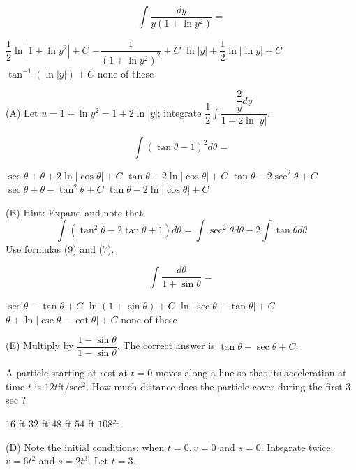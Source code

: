 \newpage




\question
\[
\displaystyle\int \dfrac{d y}{y\left(1+\ln y^{2}\right)}=
\]
\begin{choices}
  \CorrectChoice $\dfrac{1}{2} \ln \left|1+\ln y^{2}\right|+C$
  \choice $-\dfrac{1}{\left(1+\ln y^{2}\right)^{2}}+C$
  \choice $\ln |y|+\dfrac{1}{2} \ln |\ln y|+C$
  \choice $\tan ^{-1}(\ln |y|)+C$
  \choice none of these
\end{choices}
\begin{solution}
(A) Let $u=1+\ln y^{2}=1+2 \ln |y|$; integrate $\dfrac{1}{2} \displaystyle\int \dfrac{\dfrac{2}{y} d y}{1+2 \ln |y|}$.
\end{solution}

\question
\[
\displaystyle\int(\tan \theta-1)^{2} d \theta=
\]
\begin{choices}
  \choice $\sec \theta+\theta+2 \ln |\cos \theta|+C$
  \CorrectChoice $\tan \theta+2 \ln |\cos \theta|+C$
  \choice $\tan \theta-2 \sec ^{2} \theta+C$
  \choice $\sec \theta+\theta-\tan ^{2} \theta+C$
  \choice $\tan \theta-2 \ln |\cos \theta|+C$
\end{choices}
\begin{solution}
(B) Hint: Expand and note that
\[
\displaystyle\int\left(\tan ^{2} \theta-2 \tan \theta+1\right) d \theta=\displaystyle\int \sec ^{2} \theta d \theta-2 \displaystyle\int \tan \theta d \theta
\]
Use formulas (9) and (7).
\end{solution}


\newpage




\question
\[
\displaystyle\int \dfrac{d \theta}{1+\sin \theta}=
\]
\begin{choices}
  \choice $\sec \theta-\tan \theta+C$
  \choice $\ln (1+\sin \theta)+C$
  \choice $\ln |\sec \theta+\tan \theta|+C$
  \choice $\theta+\ln |\csc \theta-\cot \theta|+C$
  \CorrectChoice none of these
\end{choices}
\begin{solution}
(E) Multiply by $\dfrac{1-\sin \theta}{1-\sin \theta}$. The correct answer is $\tan \theta-\sec \theta+C$.
\end{solution}

\question
A particle starting at rest at $t=0$ moves along a line so that its acceleration at time $t$ is $12 t \mathrm{ft} / \mathrm{sec}^{2}$. How much distance does the particle cover during the first 3 sec ?
\begin{choices}
  \choice$16$ ft
  \choice$32$ ft
  \choice$48$ ft
  \CorrectChoice$54$ ft
  \choice $108 \mathrm{ft}$
\end{choices}
\begin{solution}
(D) Note the initial conditions: when $t=0, v=0$ and $s=0$. Integrate twice: $v=6 t^{2}$ and $s=2 t^{3}$. Let $t=3$.
\end{solution}

